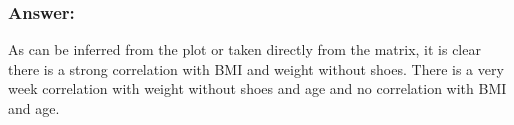 \documentclass[]{article}
\begin{document}
\hypertarget{answer-7}{%
\subsubsection{Answer:}\label{answer-7}}

As can be inferred from the plot or taken directly from the matrix, it
is clear there is a strong correlation with BMI and weight without
shoes. There is a very week correlation with weight without shoes and
age and no correlation with BMI and age.
\end{document}
